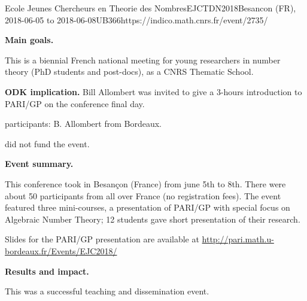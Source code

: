 \begin{event}{Ecole Jeunes Chercheurs en Theorie des
  Nombres}{EJCTDN2018}{Besancon (FR),
  2018-06-05 to 2018-06-08}{UB}{36}{6}{https://indico.math.cnrs.fr/event/2735/}

\textbf{Main goals.}

This is a biennial French national meeting for young researchers in number
  theory (PhD students and post-docs), as a CNRS Thematic School.

\textbf{ODK implication.} 
Bill Allombert was invited to give a 3-hours introduction to PARI/GP on
the conference final day.

\ODK participants: B. Allombert from Bordeaux.

\ODK did not fund the event.

\textbf{Event summary.} 

  This conference took in Besan\c{c}on (France) from june 5th to
8th. There were about 50 participants
  from all over France (no registration fees). The event featured three
  mini-courses, a presentation of PARI/GP with special focus on Algebraic
  Number Theory; 12 students gave short presentation of their research.

Slides for the PARI/GP presentation are available at
\url{http://pari.math.u-bordeaux.fr/Events/EJC2018/}

\textbf{Results and impact.} 

This was a successful teaching and dissemination event.
\end{event}
